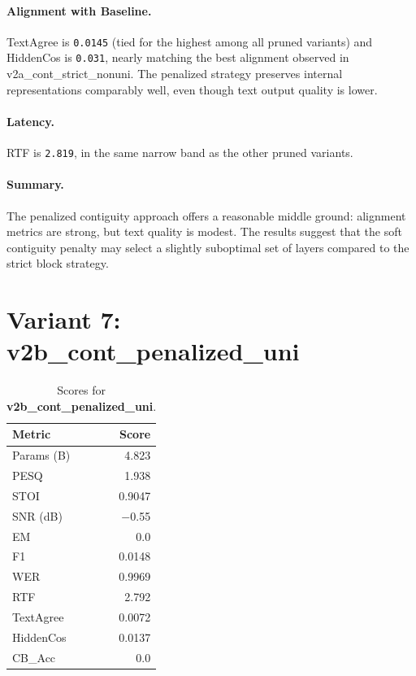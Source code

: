 \documentclass[11pt,a4paper]{article}
\newcommand{\scoreval}[1]{\texttt{#1}}
\begin{document}
\paragraph{Alignment with Baseline.}
TextAgree is \scoreval{0.0145} (tied for the highest among all pruned variants) and HiddenCos is \scoreval{0.031}, nearly matching the best alignment observed in v2a\_cont\_strict\_nonuni. The penalized strategy preserves internal representations comparably well, even though text output quality is lower.

\paragraph{Latency.}
RTF is \scoreval{2.819}, in the same narrow band as the other pruned variants.

\paragraph{Summary.}
The penalized contiguity approach offers a reasonable middle ground: alignment metrics are strong, but text quality is modest. The results suggest that the soft contiguity penalty may select a slightly suboptimal set of layers compared to the strict block strategy.

\newpage
\section{Variant 7: v2b\_cont\_penalized\_uni}

\begin{table}[H]
\centering
\caption{Scores for \textbf{v2b\_cont\_penalized\_uni}.}
\begin{tabular}{l r}
\toprule
\textbf{Metric} & \textbf{Score} \\
\midrule
Params (B)    & 4.823 \\
PESQ          & 1.938 \\
STOI          & 0.9047 \\
SNR (dB)      & $-$0.55 \\
EM            & 0.0 \\
F1            & 0.0148 \\
WER           & 0.9969 \\
RTF           & 2.792 \\
TextAgree     & 0.0072 \\
HiddenCos     & 0.0137 \\
CB\_Acc       & 0.0 \\
\bottomrule
\end{tabular}
\end{table}
\end{document}

